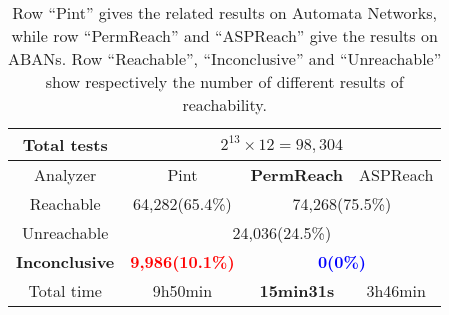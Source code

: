 \documentclass[runningheads]{llncs}
\begin{document}
\begin{table}[ht]
\begin{tabular}{|c|c|c|c|}
     Total tests&\multicolumn{3}{c|}{$2^{13}\times 12=98,304$}\\
     \hline
     Analyzer  &  Pint  &  \textbf{PermReach}   &ASPReach\\
     \hline
     Reachable & 64,282(65.4\%)  & \multicolumn{2}{c|}{74,268(75.5\%)} \\
     \hline
     Unreachable&\multicolumn{3}{c|}{24,036(24.5\%)}\\
     \hline
     \textbf{Inconclusive} &\textcolor{red}{\textbf{9,986(10.1\%)}}&\multicolumn{2}{c|}{\textcolor{blue}{\textbf{0(0\%)}}}   \\
     \hline
     Total time & 9h50min      & \textbf{15min31s}         &3h46min \\
     \hline
    \end{tabular}
\caption{
Row ``Pint'' gives the related results on Automata Networks, while row ``PermReach'' and ``ASPReach'' give the results on ABANs. 
Row ``Reachable'', ``Inconclusive'' and ``Unreachable'' show respectively the number of different results of reachability.}
\label{tab:2}
\end{table}
\end{document}
